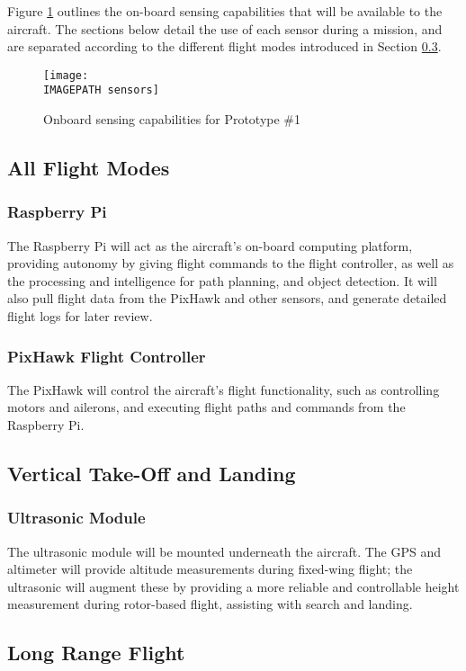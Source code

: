 \label{sec:sensing}
Figure \ref{fig:sensing} outlines the on-board sensing capabilities that will be available to the aircraft. The sections below detail the use of each sensor during a mission, and are separated according to the different flight modes introduced in Section \ref{}. 

\begin{figure}[!ht]
	\centering
	\texttt{[image: \\IMAGEPATH sensors]}
	\caption{Onboard sensing capabilities for Prototype \#1}
	\label{fig:sensing}
\end{figure}

\subsection{All Flight Modes}
\subsubsection*{Raspberry Pi}
The Raspberry Pi will act as the aircraft's on-board computing platform, providing autonomy by giving flight commands to the flight controller, as well as the processing and intelligence for path planning, and object detection. It will also pull flight data from the PixHawk and other sensors, and generate detailed flight logs for later review.

\subsubsection*{PixHawk Flight Controller}
The PixHawk will control the aircraft's flight functionality, such as controlling motors and ailerons, and executing flight paths and commands from the Raspberry Pi.

\subsection{Vertical Take-Off and Landing}
\subsubsection*{Ultrasonic Module}
The ultrasonic module will be mounted underneath the aircraft. The GPS and altimeter will provide altitude measurements during fixed-wing flight; the ultrasonic will augment these by providing a more reliable and controllable height measurement during rotor-based flight, assisting with search and landing.

\subsection{Long Range Flight}
